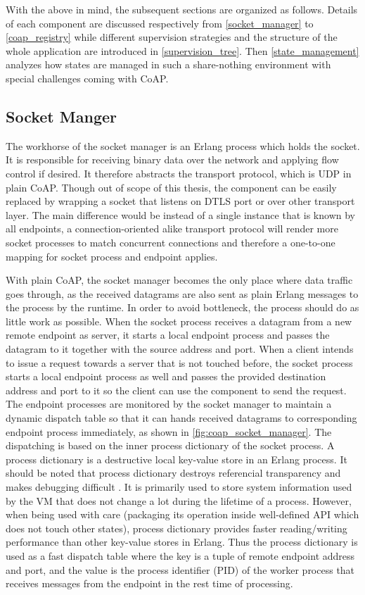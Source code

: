 With the above in mind, the subsequent sections are organized as follows. Details of each component are discussed respectively from \autoref{socket_manager} to \autoref{coap_registry} while different supervision strategies and the structure of the whole application are introduced in \autoref{supervision_tree}. Then \autoref{state_management} analyzes how states are managed in such a share-nothing environment with special challenges coming with CoAP. 

\subsection{Socket Manger}\label{socket_manager}

The workhorse of the socket manager is an Erlang process which holds the socket. It is responsible for receiving binary data over the network and applying flow control if desired. 
It therefore abstracts the transport protocol, which is UDP in plain CoAP. Though out of scope of this thesis, the component can be easily replaced by wrapping a socket that listens on DTLS port or over other transport layer. The main difference would be instead of a single instance that is known by all endpoints, a connection-oriented alike transport protocol will render more socket processes to match concurrent connections and therefore a one-to-one mapping for socket process and endpoint applies. 

With plain CoAP, the socket manager becomes the only place where data traffic goes through, as the received datagrams are also sent as plain Erlang messages to the process by the runtime. In order to avoid bottleneck, the process should do as little work as possible. When the socket process receives a datagram from a new remote endpoint as server, it starts a local endpoint process and passes the datagram to it together with the source address and port. When a client intends to issue a request towards a server that is not touched before, the socket process starts a local endpoint process as well and passes the provided destination address and port to it so the client can use the component to send the request. The endpoint processes are monitored by the socket manager to maintain a dynamic dispatch table so that it can hands received datagrams to corresponding endpoint process immediately, as shown in \autoref{fig:coap_socket_manager}. The dispatching is based on the inner process dictionary of the socket process. A process dictionary is a destructive local key-value store in an Erlang process. It should be noted that process dictionary destroys referencial transparency and makes debugging difficult \autocite{erl_proc_dict}. It is primarily used to store system information used by the VM that does not change a lot during the lifetime of a process. However, when being used with care (packaging its operation inside well-defined API which does not touch other states), process dictionary provides faster reading/writing performance than other key-value stores in Erlang. Thus the process dictionary is used as a fast dispatch table where the key is a tuple of remote endpoint address and port, and the value is the process identifier (PID) of the worker process that receives messages from the endpoint in the rest time of processing. 

